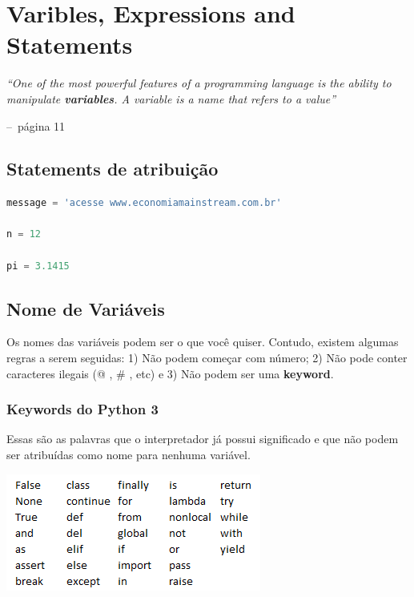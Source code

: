 \documentclass[a4paper,11pt]{book}
\makeatletter
\newenvironment{chapquote}[2][2em]
  {\setlength{\@tempdima}{#1}%
   \def\chapquote@author{#2}%
   \parshape 1 \@tempdima \dimexpr\textwidth-2\@tempdima\relax%
   \itshape}
  {\par\normalfont\hfill--\ \chapquote@author\hspace*{\@tempdima}\par\bigskip}
\makeatother
\begin{document}
\chapter{Varibles, Expressions and Statements}

\begin{chapquote}{página 11}
	``One of the most powerful features of a programming language is the ability to manipulate \textbf{variables}. A variable is a name that refers to a value''
\end{chapquote}

\section{Statements de atribuição}
\begin{lstlisting}[language=Python, caption=Atribuições para diferentes classes]
message = 'acesse www.economiamainstream.com.br'

n = 12

pi = 3.1415
\end{lstlisting}

\section{Nome de Variáveis}
Os nomes das variáveis podem ser o que você quiser. Contudo, existem algumas regras a serem seguidas: 1) Não podem começar com número; 2) Não pode conter caracteres ilegais (@ , \# ,  etc) e 3) Não podem ser uma \textbf{keyword}.

\subsection{Keywords do Python 3}
Essas são as palavras que o interpretador já possui significado e que não podem ser atribuídas como nome para nenhuma variável.

\includegraphics[scale=1]{images/keywords_python.png}
\end{document}

